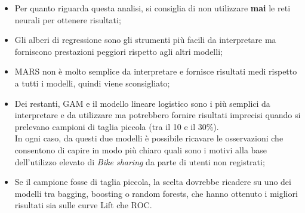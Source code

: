 \begin{itemize}
\item Per quanto riguarda questa analisi, si consiglia di non utilizzare
  \textbf{mai} le reti neurali per ottenere risultati;
\item Gli alberi di regressione sono gli strumenti più facili da interpretare
  ma forniscono prestazioni peggiori rispetto agli altri modelli;
\item MARS non è molto semplice da interpretare e fornisce risultati medi
  rispetto a tutti i modelli, quindi viene sconsigliato;
\item Dei restanti, GAM e il modello lineare logistico sono i più semplici da
  interpretare e da utilizzare ma potrebbero fornire risultati imprecisi
  quando si prelevano campioni di taglia piccola (tra il 10 e il 30\%). \\
  In ogni caso, da questi due modelli è possibile ricavare le osservazioni che
  consentono di capire in modo più chiaro quali sono i motivi alla base
  dell'utilizzo elevato di \emph{Bike sharing} da parte di utenti non
  registrati;
\item Se il campione fosse di taglia piccola, la scelta dovrebbe ricadere su
  uno dei modelli tra bagging, boosting o random forests, che hanno ottenuto i
  migliori risultati sia sulle curve Lift che ROC.
\end{itemize}

